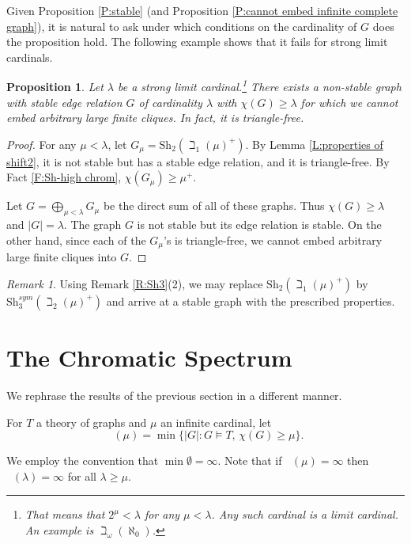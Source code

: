 \documentclass[a4paper]{amsart}
\theoremstyle{plain}
\newtheorem{proposition}[theorem]{Proposition}
\theoremstyle{definition}
\theoremstyle{remark}
\newtheorem{remark}[theorem]{Remark}
\numberwithin{equation}{section}
\newcommand{\Sh}{\text{Sh}}
\DeclareMathOperator{\ch}{ch_T}
\begin{document}
Given Proposition \ref{P:stable} (and Proposition \ref{P:cannot embed infinite complete graph}), it is natural to ask under which conditions on the cardinality of $G$ does the  proposition hold. The following example shows that it fails for strong limit cardinals.

\begin{proposition}\label{P: stable no arbt large finite cliques}
Let $\lambda$ be a strong limit cardinal.\footnote{That means that $2^\mu<\lambda$ for any $\mu<\lambda$. Any such cardinal is a limit cardinal. An example is $\beth_{\omega}(\aleph_0)$.} There exists a non-stable graph with stable edge relation $G$ of cardinality $\lambda$ with $\chi(G)\geq \lambda$ for which we cannot embed arbitrary large finite cliques. In fact, it is triangle-free.
\end{proposition}
\begin{proof}
For any $\mu<\lambda$, let $G_\mu=\Sh_2(\beth_1(\mu)^+)$. By Lemma \ref{L:properties of shift2}, it is not stable but has a stable edge relation, and it is triangle-free. By Fact \ref{F:Sh-high chrom}, $\chi(G_\mu)\geq \mu^+$.

Let $G=\bigoplus_{\mu<\lambda}G_\mu$ be the direct sum of all of these graphs. Thus $\chi(G)\geq \lambda$ and $|G|=\lambda$. The graph $G$ is not stable but its edge relation is stable.  On the other hand, since each of the $G_\mu$'s is triangle-free,  we cannot embed arbitrary large finite cliques into $G$.
\end{proof}

\begin{remark} \label{R:even stable theory}
Using Remark \ref{R:Sh3}(2), we may replace $\Sh_2(\beth_1(\mu)^+)$ by $\Sh_3^{sym}(\beth_2(\mu)^+)$ and arrive at a stable graph with the prescribed properties.
\end{remark}




\section{The Chromatic Spectrum}\label{S:chromatic}
We rephrase the results of the previous section in a different manner.

For $T$ a theory of graphs and $\mu$ an infinite cardinal, let \[\ch(\mu)=\min\{ |G|: G\vDash T,\, \chi(G)\geq \mu\}.\]

We employ the convention that $\min\emptyset=\infty$. Note that if $\ch(\mu)=\infty$ then $\ch(\lambda)=\infty$ for all $\lambda\geq \mu$.
\end{document}
